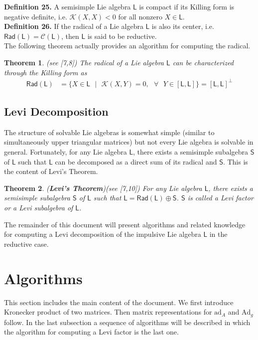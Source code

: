 \documentclass[11pt,a4paper]{article}
\newtheorem{theorem}{Theorem}
\begin{document}
\textbf{Definition 25.} A semisimple  Lie algebra $\mathsf{L}$ is compact if its Killing form is negative definite, i.e. $\mathcal{K} (X, X) < 0$ for all nonzero $X \in \mathsf{L}$.\\

\textbf{Definition 26.} If the radical of a Lie algebra $\mathsf{L}$ is also its center, i.e. $\mathsf{Rad}(\mathsf{L})= \mathcal{C}(\mathsf{L})$, then $\mathsf{L}$ is said to be reductive.\\

The following theorem actually provides an algorithm for computing the radical.

\begin{theorem}(see [7,8]) The radical of a Lie algebra $\mathsf{L}$ can be characterized through the Killing form as
\begin{align*}
\mathsf{Rad}(\mathsf{L}) & = \{ X \in \mathsf{L} \text{ } \lvert \text{ } \mathcal{K}(X,Y) = 0, \text{ } \forall  \text{ } Y \in [\mathsf{L},\mathsf{L}]  \} = [\mathsf{L},\mathsf{L}]^{\perp}
\end{align*}
\end{theorem}

%
\subsection{Levi Decomposition}
\qquad The structure of solvable Lie algebras is somewhat simple (similar to simultaneously upper triangular matrices) but not every Lie algebra is solvable in general. Fortunately, for any Lie algebra $\mathsf{L}$, there exists a semisimple subalgebra $\mathsf{S}$ of $\mathsf{L}$ such that $\mathsf{L}$ can be decomposed as a direct sum of its radical and $\mathsf{S}$. This is the content of Levi's Theorem.

\begin{theorem}(\textbf{Levi's Theorem})(see [7,10]) For any Lie algebra $\mathsf{L}$, there exists a semisimple subalgebra $\mathsf{S}$ of $\mathsf{L}$ such that
$\mathsf{L} = \mathsf{Rad}(\mathsf{L}) \oplus \mathsf{S}$.
$\mathsf{S}$ is called a Levi factor or a Levi subalgebra of $\mathsf{L}$.
\end{theorem}

The remainder of this document will present algorithms and related knowledge for computing a Levi decomposition of the impulsive Lie algebra $\mathsf{L}$ in the reductive case.

%
%
\section{Algorithms}
\qquad This section includes the main content of the document. We first introduce Kronecker product of two matrices. Then matrix representations for $\mathrm{ad}_{A}$ and $\mathrm{Ad}_{g}$ follow. In the last subsection a sequence of algorithms will be described in which the algorithm for computing a Levi factor is the last one.
\end{document}
